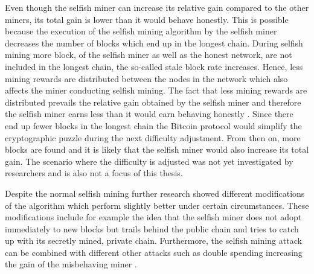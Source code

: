 Even though the selfish miner can increase its relative gain compared to the other miners, its total gain is lower than it would behave honestly.
This is possible because the execution of the selfish mining algorithm by the selfish miner decreases the number of blocks which end up in the longest chain.
During selfish mining more block, of the selfish miner as well as the honest network, are not included in the longest chain, the so-called stale block rate increases.
Hence, less mining rewards are distributed between the nodes in the network which also affects the miner conducting selfish mining.
The fact that less mining rewards are distributed prevails the relative gain obtained by the selfish miner and therefore the selfish miner earns less than it would earn behaving honestly \cite{nayak2016stubborn, sapirshtein2016optimal}.
Since there end up fewer blocks in the longest chain the Bitcoin protocol would simplify the cryptographic puzzle during the next difficulty adjustment.
From then on, more blocks are found and it is likely that the selfish miner would also increase its total gain.
The scenario where the difficulty is adjusted was not yet investigated by researchers and is also not a focus of this thesis.

Despite the normal selfish mining further research \cite{nayak2016stubborn,sapirshtein2016optimal, gervais2015tampering, gervais2016security, bahack2013theoretical} showed different modifications of the algorithm which perform slightly better under certain circumstances.
These modifications include for example the idea that the selfish miner does not adopt immediately to new blocks but trails behind the public chain and tries to catch up with its secretly mined, private chain.
Furthermore, the selfish mining attack can be combined with different other attacks such as double spending increasing the gain of the misbehaving miner \cite{gervais2016security, sapirshtein2016optimal, nayak2016stubborn, gervais2015tampering}.

